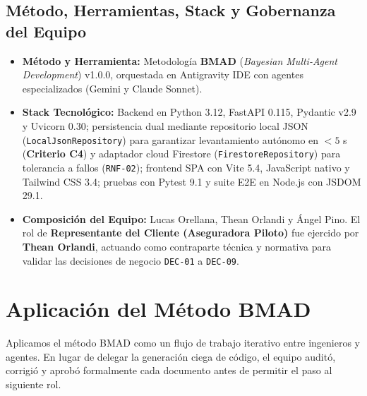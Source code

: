 \documentclass[11pt,letterpaper]{article}
\begin{document}
\subsection{Método, Herramientas, Stack y Gobernanza del Equipo}
\begin{itemize}
    \item \textbf{Método y Herramienta:} Metodología \textbf{BMAD} (\textit{Bayesian Multi-Agent Development}) v1.0.0, orquestada en Antigravity IDE con agentes especializados (Gemini y Claude Sonnet).
    \item \textbf{Stack Tecnológico:} Backend en Python 3.12, FastAPI 0.115, Pydantic v2.9 y Uvicorn 0.30; persistencia dual mediante repositorio local JSON (\texttt{LocalJsonRepository}) para garantizar levantamiento autónomo en $<5$ s (\textbf{Criterio C4}) y adaptador cloud Firestore (\texttt{FirestoreRepository}) para tolerancia a fallos (\texttt{RNF-02}); frontend SPA con Vite 5.4, JavaScript nativo y Tailwind CSS 3.4; pruebas con Pytest 9.1 y suite E2E en Node.js con JSDOM 29.1.
    \item \textbf{Composición del Equipo:} Lucas Orellana, Thean Orlandi y Ángel Pino. El rol de \textbf{Representante del Cliente (Aseguradora Piloto)} fue ejercido por \textbf{Thean Orlandi}, actuando como contraparte técnica y normativa para validar las decisiones de negocio \texttt{DEC-01} a \texttt{DEC-09}.
\end{itemize}

\newpage

\section{Aplicación del Método BMAD}

Aplicamos el método BMAD como un flujo de trabajo iterativo entre ingenieros y agentes. En lugar de delegar la generación ciega de código, el equipo auditó, corrigió y aprobó formalmente cada documento antes de permitir el paso al siguiente rol.
\end{document}
